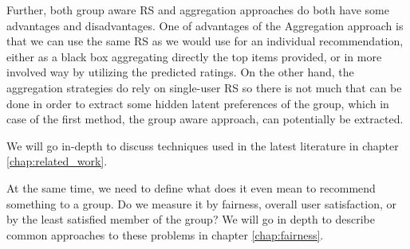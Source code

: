 Further, both group aware RS and aggregation approaches do both have some advantages and disadvantages. One of advantages of the Aggregation approach is that we can use the same RS as we would use for an individual recommendation, either as a black box aggregating directly the top items provided, or in more involved way by utilizing the predicted ratings. On the other hand, the aggregation strategies do rely on single-user RS so there is not much that can be done in order to extract some hidden latent preferences of the group, which in case of the first method, the group aware approach, can potentially be extracted.


We will go in-depth to discuss techniques used in the latest literature in chapter \ref{chap:related_work}.


At the same time, we need to define what does it even mean to recommend something to a group. Do we measure it by fairness, overall user satisfaction, or by the least satisfied member of the group? We will go in depth to describe common approaches to these problems in chapter \ref{chap:fairness}.

